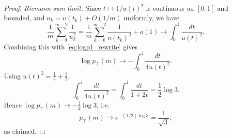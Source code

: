 \documentclass[10pt,a4paper]{amsart}
\newcommand{\ptop}{p_{\top}}
\begin{document}
\begin{proof}
\medskip
\noindent
\emph{Riemann-sum limit.}
Since \(t\mapsto 1/u(t)^2\) is continuous on \([0,1]\) and bounded, and \(u_k=u(t_k)+O(1/m)\) uniformly, we have
\[
\frac{1}{m}\sum_{k=0}^{m-2}\frac{1}{u_k^2}
=\frac{1}{m}\sum_{k=0}^{m-2}\frac{1}{u(t_k)^2}+o(1)
\longrightarrow \int_0^1\frac{dt}{u(t)^2}.
\]
Combining this with \eqref{eq:logp1_rewrite} gives
\[
\log \ptop(m)\longrightarrow -\int_0^1\frac{dt}{4u(t)^2}.
\]
Using \(u(t)^2=\frac14+\frac{t}{2}\),
\[
\int_0^1\frac{dt}{4u(t)^2}
=\int_0^1\frac{dt}{1+2t}
=\frac12\log 3.
\]
Hence \(\log \ptop(m)\to -\frac12\log 3\), i.e.
\[
\ptop(m)\to e^{-(1/2)\log 3}=\frac{1}{\sqrt3},
\]
as claimed.
\end{proof}
\end{document}
